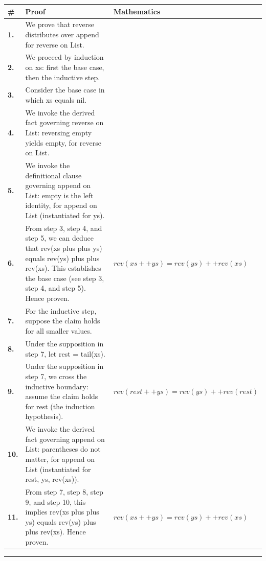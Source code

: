 \documentclass[11pt]{article}
\theoremstyle{definition}
\begin{document}
\begin{tabular}{@{} >{\raggedright\arraybackslash}p{} >{\raggedright\arraybackslash}p{} >{\raggedleft\arraybackslash}p{} @{}}
\textbf{\#} & \textbf{Proof} & \textbf{Mathematics} \\
\midrule
\textbf{1.} & We prove that reverse distributes over append for reverse on List. & \\[0.45em]
\textbf{2.} & We proceed by induction on xs: first the base case, then the inductive step. & \\[0.45em]
\textbf{3.} & Consider the base case in which xs  equals  nil. & \\[0.45em]
\textbf{4.} & We invoke the derived fact governing reverse on List: reversing empty yields empty, for reverse on List. & \\[0.45em]
\textbf{5.} & We invoke the definitional clause governing append on List: empty is the left identity, for append on List (instantiated for ys). & \\[0.45em]
\textbf{6.} & From step 3, step 4, and step 5, we can deduce that rev(xs plus plus ys) equals rev(ys) plus plus rev(xs). This establishes the base case (see step 3, step 4, and step 5). Hence proven. & $\displaystyle rev(xs ++ ys) = rev(ys) ++ rev(xs)$ \\[0.45em]
\textbf{7.} & For the inductive step, suppose the claim holds for all smaller values. & \\[0.45em]
\textbf{8.} & Under the supposition in step 7, let rest = tail(xs). & \\[0.45em]
\textbf{9.} & Under the supposition in step 7, we cross the inductive boundary: assume the claim holds for rest (the induction hypothesis). & $\displaystyle rev(rest ++ ys) = rev(ys) ++ rev(rest)$ \\[0.45em]
\textbf{10.} & We invoke the derived fact governing append on List: parentheses do not matter, for append on List (instantiated for rest, ys, rev(xs)). & \\[0.45em]
\textbf{11.} & From step 7, step 8, step 9, and step 10, this implies rev(xs plus plus ys) equals rev(ys) plus plus rev(xs). Hence proven. & $\displaystyle rev(xs ++ ys) = rev(ys) ++ rev(xs)$ \\[0.45em]
\bottomrule
\end{tabular}
\label{thm:List-reverse-reverse_distributes_over_append}
\par\medskip\hrule
\end{document}

